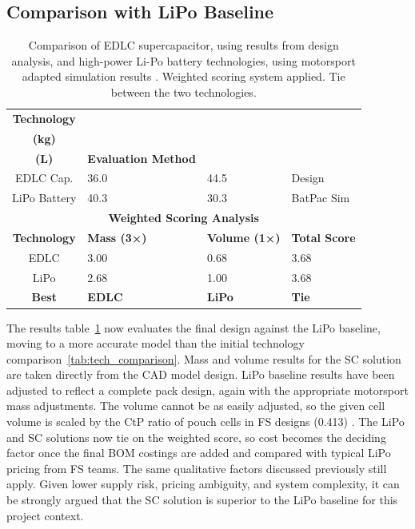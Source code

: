 \subsection{Comparison with LiPo Baseline}

\begin{table}[htbp]
    \centering
    \caption{Comparison of EDLC supercapacitor, using results from design analysis, and high-power Li-Po battery technologies, using motorsport adapted simulation results \cite{batpac2022manual}. Weighted scoring system applied. Tie between the two technologies.}
    \label{tab:results_comparison}
    \footnotesize
    \begin{tabular}{|c|l|l|l|}
        \hline
        \textbf{Technology} & \makecell{\textbf{Mass} \\ \textbf{(kg)}} & \makecell{\textbf{Volume} \\ \textbf{(L)}} & \textbf{Evaluation Method} \\
        \hline
        EDLC Cap. & 36.0 & 44.5 & Design \\
        \arrayrulecolor{gray!30}\hline\arrayrulecolor{black}
        LiPo Battery & 40.3 & 30.3 & BatPac Sim \\
        \hline
        \hline
        \multicolumn{4}{|c|}{\textbf{Weighted Scoring Analysis}} \\
        \hline
        \textbf{Technology} & \textbf{Mass (3×)} & \textbf{Volume (1×)} & \textbf{Total Score} \\
        \hline
        EDLC & 3.00 & 0.68 & 3.68 \\
        \arrayrulecolor{gray!30}\hline\arrayrulecolor{black}
        LiPo & 2.68 & 1.00 & 3.68 \\
        \hline
        \textbf{Best} & \textbf{EDLC} & \textbf{LiPo} & \cellcolor{orange!20}\textbf{Tie} \\
        \hline
    \end{tabular}
\end{table}

The results table~\ref{tab:results_comparison} now evaluates the final design against the LiPo baseline, moving to a more accurate model than the initial technology comparison~\ref{tab:tech_comparison}. Mass and volume results for the SC solution are taken directly from the CAD model design. LiPo baseline results have been adjusted to reflect a complete pack design, again with the appropriate motorsport mass adjustments. The volume cannot be as easily adjusted, so the given cell volume is scaled by the CtP ratio of pouch cells in FS designs (0.413) \cite{epp_multiphysical_battery}. The LiPo and SC solutions now tie on the weighted score, so cost becomes the deciding factor once the final BOM costings are added and compared with typical LiPo pricing from FS teams.
The same qualitative factors discussed previously still apply. Given lower supply risk, pricing ambiguity, and system complexity, it can be strongly argued that the SC solution is superior to the LiPo baseline for this project context.

